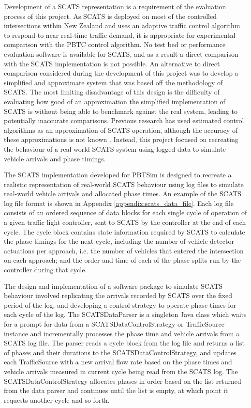 Development of a SCATS representation is a requirement of the evaluation process of this project. As SCATS is deployed on most of the controlled intersections within New Zealand and uses an adaptive traffic control algorithm to respond to near real-time traffic demand, it is appropriate for experimental comparison with the PBTC control algorithm. No test bed or performance evaluation software is available for SCATS, and as a result a direct comparison with the SCATS implementation is not possible. An alternative to direct comparison considered during the development of this project was to develop a simplified and approximate system that was based off the methodology of SCATS. The most limiting disadvantage of this design is the difficulty of evaluating how good of an approximation the simplified implementation of SCATS is without being able to benchmark against the real system, leading to potentially inaccurate comparisons. Previous research has used estimated control algorithms as an approximation of SCATS operation, although the accuracy of these approximations is not known \cite{akcelik1998evaluation}. Instead, this project focused on recreating the behaviour of a real-world SCATS system using logged data to simulate vehicle arrivals and phase timings.

The SCATS implementation developed for PBTSim is designed to recreate a realistic representation of real-world SCATS behaviour using log files to simulate real-world vehicle arrivals and allocated phase times. An example of the SCATS log file format is shown in Appendix \ref{appendix:scats_data_file}. Each log file consists of an ordered sequence of data blocks for each single cycle of operation of a given traffic light controller, sent to SCATS by the controller at the end of each cycle. The cycle block contains state information required by SCATS to calculate the phase timings for the next cycle, including the number of vehicle detector actuations per approach, i.e. the number of vehicles that entered the intersection on each approach; and the order and time of each of the phase splits run by the controller during that cycle. 

The design and implementation of a software package to simulate SCATS behaviour involved replicating the arrivals recorded by SCATS over the fixed period of the log, and developing a control strategy to operate phase times for each cycle of the log. The SCATSDataParser is a singleton Java class which waits for a prompt for data from a SCATSDataControlStrategy or TrafficSource instance and incrementally processes the phase time and vehicle arrivals from a SCATS log file. The parser reads a cycle block from the log file and returns a list of phases and their durations to the SCATSDataControlStrategy, and updates each TrafficSource with a new arrival flow rate based on the phase times and vehicle arrivals measured in current cycle being read from the SCATS log. The SCATSDataControlStrategy allocates phases in order based on the list returned from the data parser and continues until the list is empty, at which point it requests another cycle and so forth.

